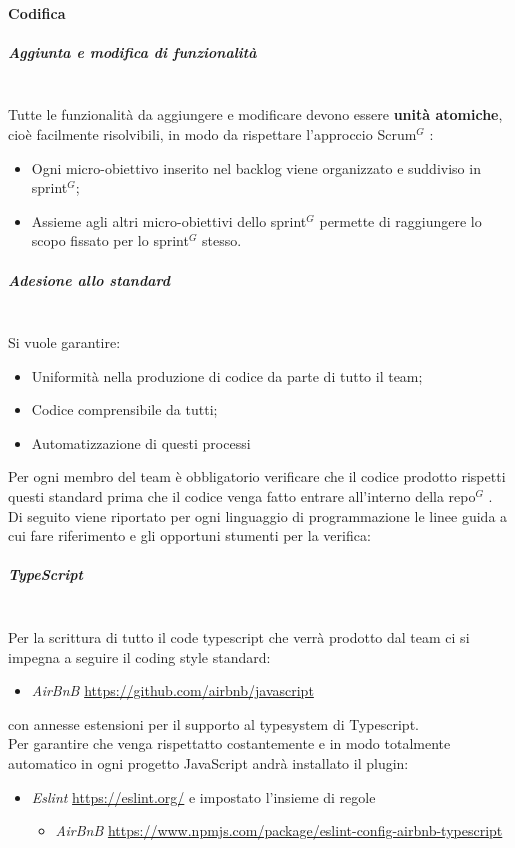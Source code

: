 \paragraph{Codifica}

\subparagraph{Aggiunta e modifica di funzionalità}
\mbox{}\\
Tutte le funzionalità da aggiungere e modificare devono essere \textbf{unità atomiche}, cioè facilmente risolvibili, in modo da rispettare
l'approccio Scrum$^G$ :
\begin{itemize}
    \item Ogni micro-obiettivo inserito nel backlog viene organizzato e suddiviso in sprint$^G$;
    \item Assieme agli altri micro-obiettivi dello sprint$^G$ permette di raggiungere lo scopo fissato per lo sprint$^G$ stesso.
\end{itemize}

\subparagraph{Adesione allo standard}
\mbox{}\\
Si vuole garantire:
\begin{itemize}
    \item Uniformità nella produzione di codice da parte di tutto il team;
    \item Codice comprensibile da tutti;
    \item Automatizzazione di questi processi
\end{itemize}
Per ogni membro del team è obbligatorio verificare che il codice prodotto rispetti questi standard prima che il codice
venga fatto entrare all'interno della repo$^G$ .\\
Di seguito viene riportato per ogni linguaggio di programmazione le linee guida a cui fare riferimento e gli opportuni
stumenti per la verifica:

\subparagraph{TypeScript}
\mbox{}\\
Per la scrittura di tutto il code typescript che verrà prodotto dal team ci si impegna a seguire il coding
style standard:
\begin{itemize}
    \item \textit{AirBnB} \href{https://github.com/airbnb/javascript}{https://github.com/airbnb/javascript}
\end{itemize}
con annesse estensioni per il supporto al typesystem di Typescript.\\

Per garantire che venga rispettatto costantemente e in modo totalmente automatico in ogni progetto JavaScript
andrà installato il plugin:
\begin{itemize}
    \item \textit{Eslint} \href{https://eslint.org/}{https://eslint.org/} e impostato l'insieme di regole
    \begin{itemize}
        \item \textit{AirBnB} \href{https://www.npmjs.com/package/eslint-config-airbnb-typescript}{https://www.npmjs.com/package/eslint-config-airbnb-typescript}
    \end{itemize}
\end{itemize}


